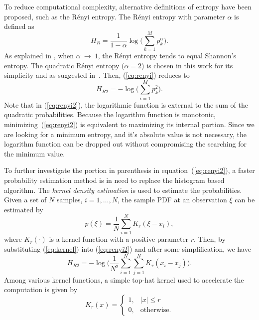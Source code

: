 \documentclass[journal,comsoc, onecolumn, 12pt,draftclsnofoot]{IEEEtran} %
\begin{document}
To reduce computational complexity, alternative definitions of entropy have been proposed, such as the R\'enyi entropy.
The R\'enyi entropy  with parameter \(\alpha\) is defined as \cite{renyi1961measures}
\begin{equation}
H_{R }={\frac {1}{1-\alpha }}\log {\Bigg (}\sum _{k=1}^{M}p_{k}^{\alpha }{\Bigg )}.
\label{eq:renyi}
\end{equation}
As explained in \cite{Bromiley2004}, when $\alpha~\to~1$, the R\'enyi entropy tends to equal Shannon's entropy.
The quadratic R\'enyi entropy ($\alpha=2$) is chosen in this work for its simplicity and as suggested in~\cite{Santamaria2002}.
Then, (\ref{eq:renyi}) reduces to
\begin{equation}
H_{R2 }=-\log {\Bigg (}\sum _{i=1}^{M}p_{k}^{2 }{\Bigg )}.
\label{eq:renyi2}
\end{equation}
Note that in (\ref{eq:renyi2}), the logarithmic function is  external to the sum of the quadratic probabilities.
Because the logarithm function is monotonic, minimizing~(\ref{eq:renyi2}) is equivalent to maximizing its internal portion.
Since we are looking for a minimum entropy, and it's absolute value is not necessary, the logarithm function can be dropped out without compromising the searching for the minimum value.

To further investigate the portion in parenthesis in equation~(\ref{eq:renyi2}), a faster probability estimation method is in need to replace the histogram based algorithm.
The \textit{kernel density estimation} is used to estimate the probabilities.
% 
% 
Given a set of \(N\) samples, \(i=1, \dots, N\), the sample PDF at an observation \(\xi\) can be estimated by~\cite{Principe2000a}
\begin{equation}
{ p(\xi)={\frac {1}{N}}\sum _{i=1}^{N}K_{r}\left(\xi-x_i\right)},
\label{eq:kernel}
\end{equation}
where $K_r(\cdot)$ is a kernel function with a positive parameter $r$.
Then, by substituting (\ref{eq:kernel}) into (\ref{eq:renyi2}) and after some simplification, we have
\begin{equation}
H_{R2 }=-\log {\Bigg (}\frac{1}{N^2}\sum _{i=1}^{N}\sum _{j=1}^{N}K_{r}\left(x_i-x_j\right){\Bigg )}.
\end{equation}
Among various kernel functions, a simple top-hat kernel used to accelerate the computation is given by
\begin{equation}
{\displaystyle K_{r}(x)={\begin{cases}1,&|x|\leq r\\0,&{\mbox{otherwise.}}\end{cases}}}
\end{equation}
\end{document}
